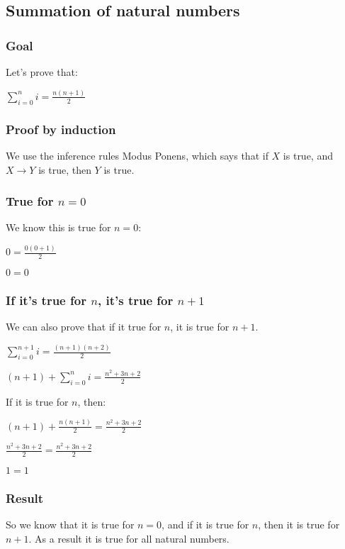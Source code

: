 
\subsection{Summation of natural numbers}


\subsubsection{Goal}

Let's prove that:

\(\sum_{i=0}^n i= \frac{n(n+1)}{2}\)

\subsubsection{Proof by induction}

We use the inference rules Modus Ponens, which says that if \(X\) is true, and \(X\rightarrow Y\) is true, then \(Y\) is true.

\subsubsection{True for \(n=0\)}

We know this is true for \(n=0\):

\(0=\frac{0(0+1)}{2}\)

\(0=0\)

\subsubsection{If it's true for \(n\), it's true for \(n+1\)}

We can also prove that if it true for \(n\), it is true for \(n+1\).

\(\sum_{i=0}^{n+1} i= \frac{(n+1)(n+2)}{2}\)

\((n+1)+\sum_{i=0}^{n} i= \frac{n^2 +3n +2}{2}\)

If it is true for \(n\), then:

\((n+1)+\frac{n(n+1)}{2}= \frac{n^2 +3n +2}{2}\)

\(\frac{n^2+3n+2}{2}= \frac{n^2 +3n +2}{2}\)

\(1=1\)

\subsubsection{Result}

So we know that it is true for \(n=0\), and if it is true for \(n\), then it is true for \(n+1\). As a result it is true for all natural numbers.

